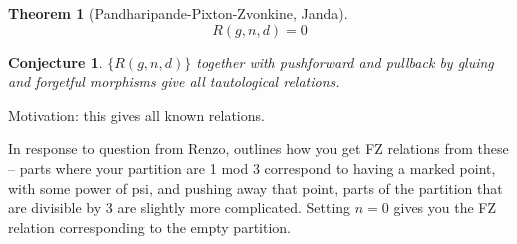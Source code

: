\documentclass{amsart}
\newtheorem{theorem}{Theorem}
\newtheorem{conjecture}{Conjecture}
\begin{document}
\begin{theorem}[Pandharipande-Pixton-Zvonkine, Janda]
$$R(g,n,d)=0$$
\end{theorem}

\begin{conjecture}
$\{R(g,n,d)\}$ together with pushforward and pullback by gluing and forgetful morphisms give all tautological relations.
\end{conjecture}

Motivation: this gives all known relations.

In response to question from Renzo, outlines how you get FZ relations from these -- parts where your partition are 1 mod 3 correspond to having a marked point, with some power of psi, and pushing away that point, parts of the partition that are divisible by 3 are slightly more complicated.  Setting $n=0$ gives you the FZ relation corresponding to the empty partition.
\end{document}
